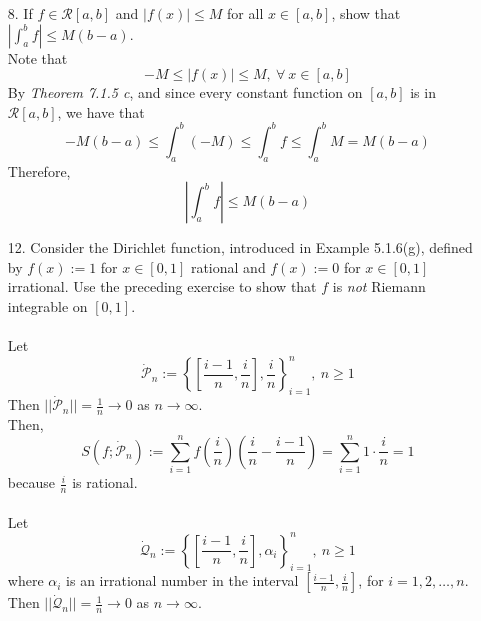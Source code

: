 \documentclass[12pt,letterpaper]{article}
\newcommand{\abs}[1]{\left\lvert #1 \right\rvert}
\newcommand{\dotp}{\dot{\mathcal{P}}}
\newcommand{\dotq}{\dot{\mathcal{Q}}}
\theoremstyle{case}
\theoremstyle{definition}
\begin{document}
\begin{enumerate}
\begin{enumerate}
\begin{enumerate}
\begin{proof}
						\[\Updownarrow\]
						\[3-3||\dotp||\leq S(f;\dotp) \leq 3+3||\dotp||\]
						\[\Updownarrow\]
						\[|S(f;\dotp)-3| \leq 3||\dotp||\]
						For arbitrary $\varepsilon >0$ we can pick a tagged partition $\dotp$ such that 
						\[||\dotp||<\frac{\varepsilon}{3}\]
						Thus $f \in \mathcal{R}[0,2]$.
				\end{proof}
			\end{enumerate}
			\item[8.] If $f \in \mathcal{R}[a,b]$ and $|f(x)| \leq M$ for all $x\in [a,b]$, show that $\abs{\int_{a}^{b}f}\leq M (b-a)$.
			\\Note that
			\[-M \leq |f(x)| \leq M,\ \forall\ x \in [a,b]\]
			By \textit{Theorem 7.1.5 c}, and since every constant function on $[a,b]$ is in $\mathcal{R}[a,b]$, we have that
			\[-M(b-a) \leq \int_{a}^{b} (-M) \leq \int_{a}^{b} f \leq \int_{a}^{b} M = M(b-a)\]
			Therefore, 
			\[\abs{\int_{a}^{b}f}\leq M(b-a)\]
			\item[12.] Consider the Dirichlet function, introduced in Example 5.1.6(g), defined by $f(x):=1$ for $x \in [0,1]$ rational and $f(x):=0$ for $x \in [0,1]$ irrational. Use the preceding exercise to show that $f$ is \textit{not} Riemann integrable on $[0,1]$.\\
			\\Let
			\[\dotp_n:= \left\{\left[\frac{i-1}{n},\frac{i}{n}\right], \frac{i}{n}\right\}_{i=1}^n,\ n \geq 1\]
			Then $||\dotp_n||=\frac{1}{n} \to 0$ as $n \to \infty$.
			\\Then,
			\[S(f;\dotp_n):=\sum_{i=1}^{n}f\left(\frac{i}{n}\right)\left(\frac{i}{n}-\frac{i-1}{n}\right)=\sum_{i=1}^{n}1 \cdot \frac{i}{n} = 1\]
			because $\frac{i}{n}$ is rational.
			\\\\Let 
			\[\dotq_n:=\left\{\left[\frac{i-1}{n},\frac{i}{n}\right],\alpha_i\right\}_{i=1}^n,\ n \geq 1\]
			where $\alpha_i$ is an irrational number in the interval $\left[\frac{i-1}{n}, \frac{i}{n}\right]$, for $i=1,2,\dots,n$.
			\\Then $||\dotq_n||=\frac{1}{n} \to 0$ as $n \to \infty$.

\end{enumerate}
\end{enumerate}
\end{document}
